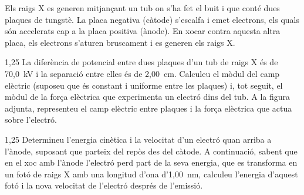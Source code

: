 Els raigs X es generen mitjançant un tub on s'ha fet el buit i que conté dues plaques de tungstè. La placa negativa (càtode) s'escalfa i emet electrons, els quals són accelerats cap a la placa positiva (ànode). En xocar contra aquesta altra placa, els electrons s'aturen bruscament i es generen els raigs X.

\begin{apartat}{1,25}
La diferència de potencial entre dues plaques d'un tub de raigs X és de 70,0~kV i la separació entre elles és de 2,00~cm. Calculeu el mòdul del camp elèctric (suposeu que és constant i uniforme entre les plaques) i, tot seguit, el mòdul de la força elèctrica que experimenta un electró dins del tub. A la figura adjunta, representeu el camp elèctric entre plaques i la força elèctrica que actua sobre l'electró.
\end{apartat}

\begin{apartat}{1,25}
Determineu l'energia cinètica i la velocitat d'un electró quan arriba a l'ànode, suposant que parteix del repòs des del càtode. A continuació, sabent que en el xoc amb l'ànode l'electró perd part de la seva energia, que es transforma en un fotó de raigs X amb una longitud d'ona d'1,00~nm, calculeu l'energia d'aquest fotó i la nova velocitat de l'electró després de l'emissió.
\end{apartat}


